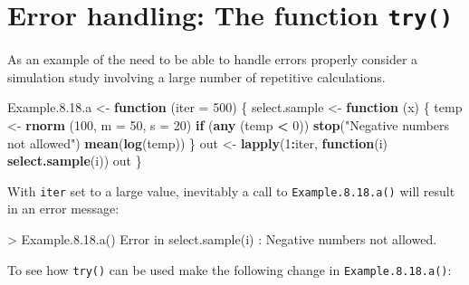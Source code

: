 \documentclass[
]{book}
\newenvironment{Shaded}{\begin{snugshade}}{\end{snugshade}}
\newcommand{\AttributeTok}[1]{\textcolor[rgb]{0.13,0.29,0.53}{#1}}
\newcommand{\ControlFlowTok}[1]{\textcolor[rgb]{0.13,0.29,0.53}{\textbf{#1}}}
\newcommand{\DecValTok}[1]{\textcolor[rgb]{0.00,0.00,0.81}{#1}}
\newcommand{\FloatTok}[1]{\textcolor[rgb]{0.00,0.00,0.81}{#1}}
\newcommand{\FunctionTok}[1]{\textcolor[rgb]{0.13,0.29,0.53}{\textbf{#1}}}
\newcommand{\NormalTok}[1]{#1}
\newcommand{\OtherTok}[1]{\textcolor[rgb]{0.56,0.35,0.01}{#1}}
\newcommand{\SpecialCharTok}[1]{\textcolor[rgb]{0.81,0.36,0.00}{\textbf{#1}}}
\newcommand{\StringTok}[1]{\textcolor[rgb]{0.31,0.60,0.02}{#1}}
\begin{document}
\section{\texorpdfstring{Error handling: The function \texttt{try()}}{Error handling: The function try()}}\label{error-handling-the-function-try}

As an example of the need to be able to handle errors properly consider a simulation study involving a large number of repetitive calculations.

\begin{Shaded}
\begin{Highlighting}[]
\NormalTok{Example.}\DecValTok{8}\NormalTok{.}\FloatTok{18.}\NormalTok{a }\OtherTok{\textless{}{-}} \ControlFlowTok{function}\NormalTok{ (}\AttributeTok{iter =} \DecValTok{500}\NormalTok{)}
\NormalTok{\{ select.sample }\OtherTok{\textless{}{-}} \ControlFlowTok{function}\NormalTok{ (x) }
\NormalTok{  \{ temp }\OtherTok{\textless{}{-}} \FunctionTok{rnorm}\NormalTok{ (}\DecValTok{100}\NormalTok{, }\AttributeTok{m =} \DecValTok{50}\NormalTok{, }\AttributeTok{s =} \DecValTok{20}\NormalTok{)}
    \ControlFlowTok{if}\NormalTok{ (}\FunctionTok{any}\NormalTok{ (temp }\SpecialCharTok{\textless{}} \DecValTok{0}\NormalTok{)) }\FunctionTok{stop}\NormalTok{(}\StringTok{"Negative numbers not allowed"}\NormalTok{)}
    \FunctionTok{mean}\NormalTok{(}\FunctionTok{log}\NormalTok{(temp))                                                         \}}
\NormalTok{  out }\OtherTok{\textless{}{-}} \FunctionTok{lapply}\NormalTok{(}\DecValTok{1}\SpecialCharTok{:}\NormalTok{iter, }\ControlFlowTok{function}\NormalTok{(i) }\FunctionTok{select.sample}\NormalTok{(i))}
\NormalTok{  out}
\NormalTok{\}}
\end{Highlighting}
\end{Shaded}

With \texttt{iter} set to a large value, inevitably a call to \texttt{Example.8.18.a()} will result in an error message:

\begin{Shaded}
\begin{Highlighting}[]
\NormalTok{\textgreater{} Example.8.18.a()}
\NormalTok{Error in select.sample(i) : Negative numbers not allowed.}
\end{Highlighting}
\end{Shaded}

To see how \texttt{try()} can be used make the following change in \texttt{Example.8.18.a()}:
\end{document}
